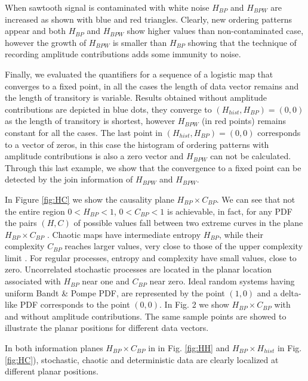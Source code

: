 When sawtooth signal is contaminated with white noise $H_{BP}$ and $H_{BPW}$ are increased as shown with blue and red triangles.
Clearly, new ordering patterns appear and both $H_{BP}$ and $H_{BPW}$ show higher values than non-contaminated case, however the growth of $H_{BPW}$ is smaller than $H_{BP}$ showing that the technique of recording amplitude contributions adds some immunity to noise.

Finally, we evaluated the quantifiers for a sequence of a logistic map that converges to a fixed point, in all the cases the length of data vector remains and the length of transitory is variable.
Results obtained without amplitude contributions are depicted in blue dots, they converge to $(H_{hist}, H_{BP})=(0, 0)$ as the length of transitory is shortest, however $H_{BPW}$ (in red points) remains constant for all the cases.
The last point in $(H_{hist}, H_{BP})=(0, 0)$ corresponds to a vector of zeros, in this case the histogram of ordering patterns with amplitude contributions is also a zero vector and $H_{BPW}$ can not be calculated.
Through this last example, we show that the convergence to a fixed point can be detected by the join information of $H_{BPW}$ and $H_{BPW}$.

In Figure \ref{fig:HC} we show the causality plane $H_{BP} \times C_{BP}$.
We can see that not the entire region $0<H_{BP}<1$, $0<C_{BP}<1$ is achievable, in fact, for any PDF the pairs $(H,C)$ of possible values fall between two extreme curves in the plane $H_{BP} \times C_{BP}$ \cite{Anteneodo1996}.
Chaotic maps have intermediate entropy $H_{BP}$, while their complexity $C_{BP}$ reaches larger values, very close to those of the upper complexity limit \cite{Rosso2007,Olivares2012B}.
For regular processes, entropy and complexity have small values, close to zero. 
Uncorrelated stochastic processes are located in the planar location associated with $H_{BP}$ near one and $C_{BP}$ near zero.
Ideal random systems having uniform Bandt \& Pompe PDF, are represented by the point $(1,0)$ \cite{Gonzalez2005} and a delta-like PDF corresponds to the point $(0,0)$.
In Fig. 2 we show $H_{BP} \times C_{BP}$ with and without amplitude contributions.
The same sample points are showed to illustrate the planar positions for different data vectors.

In both information planes $H_{BP} \times C_{BP}$ in in Fig. \ref{fig:HH} and $H_{BP} \times H_{hist}$ in Fig. \ref{fig:HC}), stochastic, chaotic and deterministic data are clearly localized at different planar positions.

